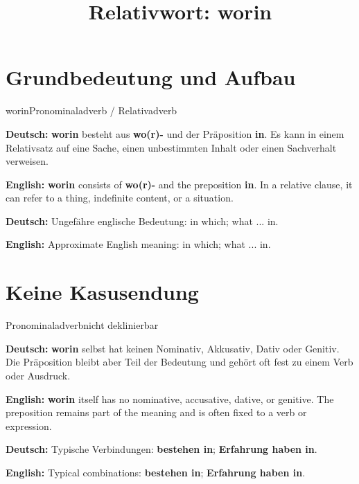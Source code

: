 \documentclass[a4paper,11pt]{article}
\title{Relativwort: \glqq worin\grqq{}}
\date{}
\newcommand{\GermanText}[1]{\textbf{Deutsch: }#1\par}
\newcommand{\EnglishText}[1]{{\small\color{SoftGray}\textbf{English: }#1\par}}
\begin{document}
\maketitle

\tableofcontents

\newpage

\section{Grundbedeutung und Aufbau}

\begin{grammarentry}{worin}{Pronominaladverb / Relativadverb}

\GermanText{\textbf{worin} besteht aus \textbf{wo(r)-} und der Präposition \textbf{in}. Es kann in einem Relativsatz auf eine Sache, einen unbestimmten Inhalt oder einen Sachverhalt verweisen.}

\EnglishText{\textbf{worin} consists of \textbf{wo(r)-} and the preposition \textbf{in}. In a relative clause, it can refer to a thing, indefinite content, or a situation.}

\GermanText{Ungefähre englische Bedeutung: \glqq in which; what ... in\grqq{}.}

\EnglishText{Approximate English meaning: \glqq in which; what ... in\grqq{}.}

\end{grammarentry}

\section{Keine Kasusendung}

\begin{grammarentry}{Pronominaladverb}{nicht deklinierbar}

\GermanText{\textbf{worin} selbst hat keinen Nominativ, Akkusativ, Dativ oder Genitiv. Die Präposition bleibt aber Teil der Bedeutung und gehört oft fest zu einem Verb oder Ausdruck.}

\EnglishText{\textbf{worin} itself has no nominative, accusative, dative, or genitive. The preposition remains part of the meaning and is often fixed to a verb or expression.}

\GermanText{Typische Verbindungen: \textbf{bestehen in}; \textbf{Erfahrung haben in}.}

\EnglishText{Typical combinations: \textbf{bestehen in}; \textbf{Erfahrung haben in}.}

\end{grammarentry}
\end{document}

